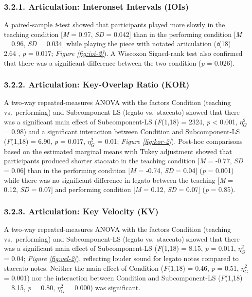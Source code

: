 \documentclass[
  english,
  man,floatsintext]{apa6}
\begin{document}
\hypertarget{articulation-interonset-intervals-iois-1}{%
\subsubsection{3.2.1. Articulation: Interonset Intervals (IOIs)}\label{articulation-interonset-intervals-iois-1}}

A paired-sample \emph{t}-test showed that participants played more slowly in the teaching condition {[}\emph{M} = 0.97, \emph{SD} = 0.042{]} than in the performing condition {[}\emph{M} = 0.96, \emph{SD} = 0.034{]} while playing the piece with notated articulation (\emph{t}(18) = 2.64
, \emph{p} = 0.017; \emph{Figure \ref{fig:ioi-2}}). A Wiscoxon Signed-rank test also confirmed that there was a significant difference between the two condition (\emph{p} = 0.026).

\hypertarget{articulation-key-overlap-ratio-kor}{%
\subsubsection{3.2.2. Articulation: Key-Overlap Ratio (KOR)}\label{articulation-key-overlap-ratio-kor}}

A two-way repeated-measures ANOVA with the factors Condition (teaching vs.~performing) and Subcomponent-LS (legato vs.~staccato) showed that there was a significant main effect of Subcomponent-LS (\emph{F}(1,18) = 2324, \emph{p} \textless{} 0.001, \(\eta_G^2\) = 0.98) and a significant interaction between Condition and Subcomponent-LS (\emph{F}(1,18) = 6.90, \emph{p} = 0.017, \(\eta_G^2\) = 0.01; \emph{Figure \ref{fig:kor-2}}). Post-hoc comparisons based on the estimated marginal means with Tukey adjustment showed that participants produced shorter staccato in the teaching condition {[}\emph{M} = -0.77, \emph{SD} = 0.06{]} than in the performing condition {[}\emph{M} = -0.74, \emph{SD} = 0.04{]} (\emph{p} = 0.001) while there was no significant difference in legato between the teaching {[}\emph{M} = 0.12, \emph{SD} = 0.07{]} and performing condition {[}\emph{M} = 0.12, \emph{SD} = 0.07{]} (\emph{p} = 0.85).

\hypertarget{articulation-key-velocity-kv-1}{%
\subsubsection{3.2.3. Articulation: Key Velocity (KV)}\label{articulation-key-velocity-kv-1}}

A two-way repeated-measures ANOVA with the factors Condition (teaching vs.~performing) and Subcomponent-LS (legato vs.~staccato) showed that there was a significant main effect of Subcomponent-LS (\emph{F}(1,18) = 8.15, \emph{p} = 0.011, \(\eta_G^2\) = 0.04; \emph{Figure \ref{fig:vel-2}}), reflecting louder sound for legato notes compared to staccato notes. Neither the main effect of Condition (\emph{F}(1,18) = 0.46, \emph{p} = 0.51, \(\eta_G^2\) = 0.001) nor the interaction between Condition and Subcomponent-LS (\emph{F}(1,18) = 8.15, \emph{p} = 0.80, \(\eta_G^2\) = 0.000) was significant.
\end{document}
